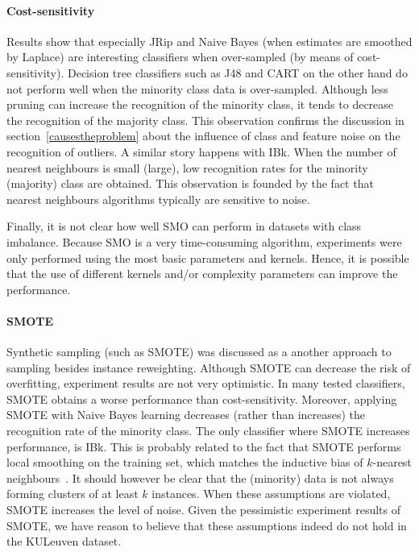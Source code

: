 \paragraph{Cost-sensitivity} Results show that especially JRip and Naive Bayes (when estimates are smoothed by Laplace) are interesting classifiers when over-sampled (by means of cost-sensitivity). Decision tree classifiers such as J48 and CART on the other hand do not perform well when the minority class data is over-sampled. Although less pruning can increase the recognition of the minority class, it tends to decrease the recognition of the majority class. This observation confirms the discussion in section~\ref{causestheproblem} about the influence of class and feature noise on the recognition of outliers. A similar story happens with IBk. When the number of nearest neighbours is small (large), low recognition rates for the minority (majority) class are obtained. This observation is founded by the fact that nearest neighbours algorithms typically are sensitive to noise.

Finally, it is not clear how well SMO can perform in datasets with class imbalance. Because SMO is a very time-consuming algorithm, experiments were only performed using the most basic parameters and kernels. Hence, it is possible that the use of different kernels and/or complexity parameters can improve the performance.

\newpage
\paragraph{SMOTE} Synthetic sampling (such as SMOTE) was discussed as a another approach to sampling besides instance reweighting. Although SMOTE can decrease the risk of overfitting, experiment results are not very optimistic. In many tested classifiers, SMOTE obtains a worse performance than cost-sensitivity. Moreover, applying SMOTE with Naive Bayes learning decreases (rather than increases) the recognition rate of the minority class. The only classifier where SMOTE increases performance, is IBk. This is probably related to the fact that SMOTE performs local smoothing on the training set, which matches the inductive bias of $k$-nearest neighbours~\cite{joydeep07}. It should however be clear that the (minority) data is not always forming clusters of at least $k$ instances. When these assumptions are violated, SMOTE increases the level of noise. Given the pessimistic experiment results of SMOTE, we have reason to believe that these assumptions indeed do not hold in the KULeuven dataset.


